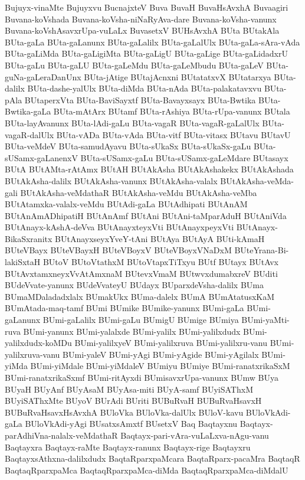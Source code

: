 {Bujuyx-vinaMte
Bujuyxvu
BucnajxteV
Buva
BuvaH
BuvaHsAvxhA
Buvaagiri
Buvana-koVshada
Buvana-koVsha-niNaRyAva-dare
Buvana-koVsha-vanunx
Buvana-koVshAsavxrUpa-vuLaLx
BuvasetxV
BUHsAvxhA
BUta
BUtakAla
BUta-gaLa
BUta-gaLanunx
BUta-gaLalilx
BUta-gaLalUlx
BUta-gaLa-sAra-vAda
BUta-gaLiMda
BUta-gaLigiMta
BUta-gaLigU
BUta-gaLige
BUta-gaLidadxrU
BUta-gaLu
BUta-gaLU
BUta-gaLeMdu
BUta-gaLeMbudu
BUta-gaLeV
BUta-guNa-gaLeraDanUnx
BUta-jAtige
BUtajAcnxni
BUtatatxvX
BUtatarxya
BUta-dalilx
BUta-dashe-yalUlx
BUta-diMda
BUta-nAda
BUta-palakatavxvu
BUta-pAla
BUtaperxVta
BUta-BaviSayxtf
BUta-Bavayxsayx
BUta-Bwtika
BUta-Bwtika-gaLa
BUta-mAtArx
BUtamf
BUta-rAshiya
BUta-rUpa-vanunx
BUtala
BUta-layAvanunx
BUta-lAdi-gaLu
BUta-vagaR
BUta-vagaR-gaLalUlx
BUta-vagaR-dalUlx
BUta-vADa
BUta-vAda
BUta-vitf
BUta-vitasx
BUtavu
BUtavU
BUta-veMdeV
BUta-samudAyavu
BUta-sUkaSx
BUta-sUkaSx-gaLu
BUta-sUSamx-gaLanenxV
BUta-sUSamx-gaLu
BUta-sUSamx-gaLeMdare
BUtasayx
BUtA
BUtAMta-rAtAmx
BUtAH
BUtAkAsha
BUtAkAshakekx
BUtAkAshada
BUtAkAsha-dalilx
BUtAkAsha-vanunx
BUtAkAsha-valalx
BUtAkAsha-veMda-gali
BUtAkAsha-veMdathaR
BUtAkAsha-veMdu
BUtAkAsha-veMba
BUtAtamxka-valalx-veMdu
BUtAdi-gaLa
BUtAdhipati
BUtAnAM
BUtAnAmADhipatiH
BUtAnAmf
BUtAni
BUtAni-taMparAduH
BUtAniVda
BUtAnayx-kAshA-deVva
BUtAnayxteyxVti
BUtAnayxpeyxVti
BUtAnayx-BikaSxranitx
BUtAnayxseyxYveY-tAni
BUtAya
BUtAyA
BUti-kAmaH
BUteVBayx
BUteVBayxH
BUteVBoyxV
BUteVBoyxVNaDxM
BUteYrana-Bi-lakiSxtaH
BUtoV
BUtoVtathxM
BUtoVtapxTiTxyu
BUtf
BUtayx
BUtAvx
BUtAvxtamxneyxVvAtAmxnaM
BUtevxVmaM
BUtwvxdumabxreV
BUditi
BUdeVvate-yanunx
BUdeVvateyU
BUdayx
BUparxdeVsha-dalilx
BUma
BUmaMDaladadxlalx
BUmakUkx
BUma-dalelx
BUmA
BUmAtatusxKaM
BUmAtada-maq-tamf
BUmi
BUmike
BUmike-yanunx
BUmi-gaLa
BUmi-gaLanunx
BUmi-gaLalilx
BUmi-gaLu
BUmigU
BUmige
BUmiya
BUmi-yaMti-ruva
BUmi-yanunx
BUmi-yalalxde
BUmi-yalilx
BUmi-yalilxdudx
BUmi-yalilxdudx-koMDu
BUmi-yalilxyeV
BUmi-yalilxruva
BUmi-yalilxru-vanu
BUmi-yalilxruva-vanu
BUmi-yaleV
BUmi-yAgi
BUmi-yAgide
BUmi-yAgilalx
BUmi-yiMda
BUmi-yiMdale
BUmi-yiMdaleV
BUmiyu
BUmiye
BUmi-ranatxrikaSxM
BUmi-ranatxrikaSxmf
BUmi-ritAyxdi
BUmisavxrUpa-vanunx
BUmw
BUya
BUyaH
BUyAnf
BUyAsaM
BUyAsa-miti
BUyA-samf
BUyiSAThxM
BUyiSAThxMte
BUyoV
BUrAdi
BUriti
BUBuRvaH
BUBuRvaHsavxH
BUBuRvaHsavxHsAvxhA
BUloVka
BUloVka-dalUlx
BUloV-kavu
BUloVkAdi-gaLa
BUloVkAdi-yAgi
BUsatxsAmxtf
BUsetxV
Baq
Baqtayxnu
Baqtayx-parAdhiVna-nalalx-veMdathaR
Baqtayx-pari-vAra-vuLaLxva-nAgu-vanu
Baqtayxra
Baqtayx-raMte
Baqtayx-ranunx
Baqtayx-rige
Baqtayxru
BaqtayxsAthxna-dalilxdudx
BaqtaRparxpaMcara
BaqtaRparx-pacaMra
BaqtaqR
BaqtaqRparxpaMca
BaqtaqRparxpaMca-diMda
BaqtaqRparxpaMca-diMdalU
}
